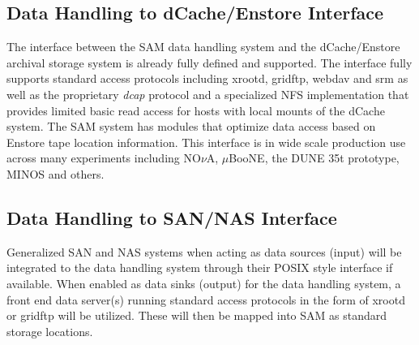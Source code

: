 \documentclass[pdftex,12pt,letter]{article}
\begin{document}
\subsection{Data Handling to dCache/Enstore Interface}
The interface between the SAM data handling system and the dCache/Enstore archival storage system is already fully defined and supported.
 The interface fully supports standard access protocols including xrootd, gridftp, webdav and srm as well as the proprietary \textit{dcap} protocol
and a specialized NFS implementation that provides limited basic read access for hosts with local mounts of the dCache system.
The SAM system has modules that optimize data access based on Enstore tape location information.  This interface is in wide scale
production use across many experiments including NO$\nu$A, $\mu$BooNE, the DUNE 35t prototype, MINOS and others.

\subsection{Data Handling to SAN/NAS Interface}
Generalized SAN and NAS systems when acting as data sources (input) will be integrated to the data handling system through their POSIX style interface if available.  When enabled as data sinks (output) for the data handling system, a front end data server(s) running standard access protocols in the form of xrootd or gridftp will be utilized.  These will then be mapped into SAM as standard storage locations.
  
\end{document}
